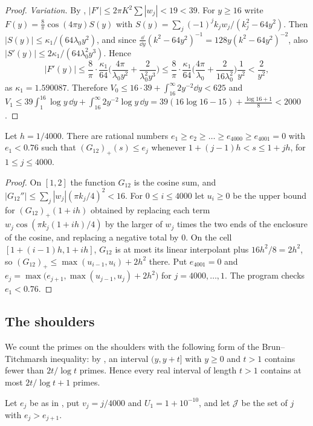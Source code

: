 \documentclass[11pt,colorlinks]{charlie}
\newcommand{\cJ}{\mathcal J}
\begin{document}
\begin{proof}
\emph{Variation.} By , $|F'|\le2\pi K^2\sum|w_j|<19<39$. For $y\ge16$ write $F(y)=\frac8\pi\cos(4\pi y)S(y)$ with $S(y)=\sum_j(-1)^jk_jw_j/(k_j^2-64y^2)$. Then $|S(y)|\le\kappa_1/(64\lambda_0y^2)$, and since $\frac{\dd}{\dd y}(k^2-64y^2)^{-1}=128y(k^2-64y^2)^{-2}$, also $|S'(y)|\le2\kappa_1/(64\lambda_0^2y^3)$. Hence
\[
 |F'(y)|\le\frac8\pi\cdot\frac{\kappa_1}{64}\Big(\frac{4\pi}{\lambda_0y^2}+\frac2{\lambda_0^2y^3}\Big)\le\frac8\pi\cdot\frac{\kappa_1}{64}\Big(\frac{4\pi}{\lambda_0}+\frac2{16\lambda_0^2}\Big)\frac1{y^2}<\frac2{y^2},
\]
as $\kappa_1=1.590087$. Therefore $V_0\le16\cdot39+\int_{16}^\infty2y^{-2}\dd y<625$ and $V_1\le39\int_1^{16}\log y\,\dd y+\int_{16}^\infty2y^{-2}\log y\,\dd y=39(16\log16-15)+\frac{\log16+1}8<2000$.
\end{proof}

\begin{lemma}\label{lem:twelve-steps}
Let $h=1/4000$. There are rational numbers $e_1\ge e_2\ge\dots\ge e_{4000}\ge e_{4001}=0$ with $e_1<0.76$ such that $(G_{12})_+(s)\le e_j$ whenever $1+(j-1)h<s\le1+jh$, for $1\le j\le4000$.
\end{lemma}
\begin{proof}
On $[1,2]$ the function $G_{12}$ is the cosine sum, and $|G_{12}''|\le\sum_j|w_j|(\pi k_j/4)^2<16$. For $0\le i\le4000$ let $u_i\ge0$ be the upper bound for $(G_{12})_+(1+ih)$ obtained by replacing each term $w_j\cos(\pi k_j(1+ih)/4)$ by the larger of $w_j$ times the two ends of the enclosure of the cosine, and replacing a negative total by $0$. On the cell $[1+(i-1)h,1+ih]$, $G_{12}$ is at most its linear interpolant plus $16h^2/8=2h^2$, so $(G_{12})_+\le\max(u_{i-1},u_i)+2h^2$ there. Put $e_{4001}=0$ and $e_j=\max\big(e_{j+1},\max(u_{j-1},u_j)+2h^2\big)$ for $j=4000,\dots,1$. The program checks $e_1<0.76$.
\end{proof}

\subsection{The shoulders}
We count the primes on the shoulders with the following form of the Brun--Titchmarsh inequality: by \cite[Thm.~2]{MV}, an interval $(y,y+t]$ with $y\ge0$ and $t>1$ contains fewer than $2t/\log t$ primes. Hence every real interval of length $t>1$ contains at most $2t/\log t+1$ primes.

Let $e_j$ be as in , put $v_j=j/4000$ and $U_1=1+10^{-10}$, and let $\cJ$ be the set of $j$ with $e_j>e_{j+1}$.
\end{document}
